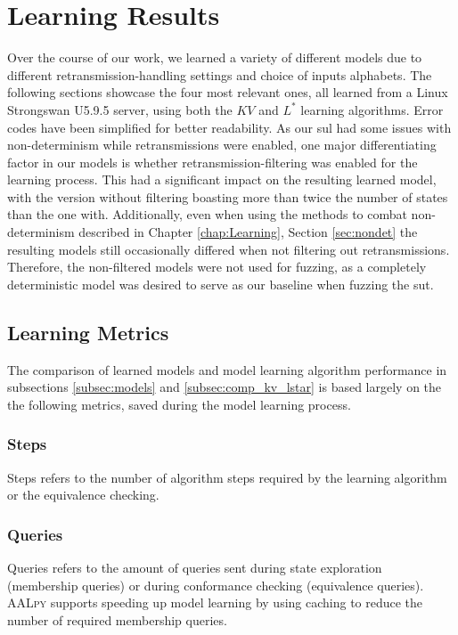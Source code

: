 \section{Learning Results} \label{sec:learnresults}
Over the course of our work, we learned a variety of different models due to different retransmission-handling settings and choice of inputs alphabets. The following sections showcase the four most relevant ones, all learned from a Linux Strongswan U5.9.5 server, using both the $KV$ and $L^*$ learning algorithms. Error codes have been simplified for better readability. As our \ac{sul} had some issues with non-determinism while retransmissions were enabled, one major differentiating factor in our models is whether retransmission-filtering was enabled for the learning process. This had a significant impact on the resulting learned model, with the version without filtering boasting more than twice the number of states than the one with. Additionally, even when using the methods to combat non-determinism described in Chapter \ref{chap:Learning}, Section \ref{sec:nondet} the resulting models still occasionally differed when not filtering out retransmissions. Therefore, the non-filtered models were not used for fuzzing, as a completely deterministic model was desired to serve as our baseline when fuzzing the \ac{sut}.

\subsection{Learning Metrics} \label{subsec:metrics}
The comparison of learned models and model learning algorithm performance in subsections \ref{subsec:models} and \ref{subsec:comp_kv_lstar} is based largely on the the following metrics, saved during the model learning process.

\subsubsection*{Steps}
Steps refers to the number of algorithm steps required by the learning algorithm or the equivalence checking.

\subsubsection*{Queries}
Queries refers to the amount of queries sent during state exploration (membership queries) or during conformance checking (equivalence queries). \textsc{AALpy} supports speeding up model learning by using caching to reduce the number of required membership queries. 

